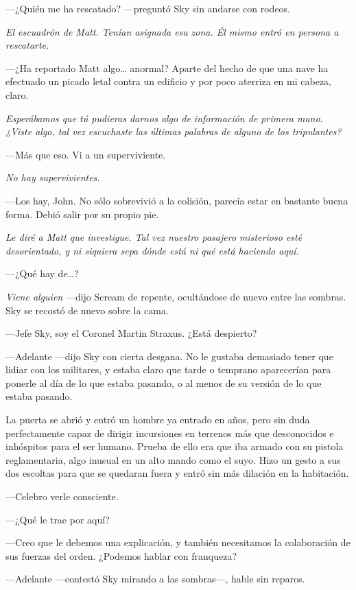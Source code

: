 ---¿Quién me ha rescatado? ---preguntó Sky sin andarse con rodeos.

\emph{El escuadrón de Matt. Tenían asignada esa zona. Él mismo entró en persona a rescatarte.}

---¿Ha reportado Matt algo\dots{} anormal? Aparte del hecho de que una nave ha efectuado un picado letal contra un edificio y por poco aterriza en mi cabeza, claro.

\emph{Esperábamos que tú pudieras darnos algo de información de primera mano. ¿Viste algo, tal vez escuchaste las últimas palabras de alguno de los tripulantes?}

---Más que eso. Vi a un superviviente.

\emph{No hay supervivientes.}

---Los hay, John. No sólo sobrevivió a la colisión, parecía estar en bastante buena forma. Debió salir por su propio pie.

\emph{Le diré a Matt que investigue. Tal vez nuestro pasajero misterioso esté desorientado, y ni siquiera sepa dónde está ni qué está haciendo aquí.}

---¿Qué hay de\dots{}?

\emph{Viene alguien} ---dijo Scream de repente, ocultándose de nuevo entre las sombras. Sky se recostó de nuevo sobre la cama.

---Jefe Sky, soy el Coronel Martin Straxus. ¿Está despierto?

---Adelante ---dijo Sky con cierta desgana. No le gustaba demasiado tener que lidiar con los militares, y estaba claro que tarde o temprano aparecerían para ponerle al día de lo que estaba pasando, o al menos de su versión de lo que estaba pasando.

La puerta se abrió y entró un hombre ya entrado en años, pero sin duda perfectamente capaz de dirigir incursiones en terrenos más que desconocidos e inhóspitos para el ser humano. Prueba de ello era que iba armado con su pistola reglamentaria, algo inusual en un alto mando como el suyo. Hizo un gesto a sus dos escoltas para que se quedaran fuera y entró sin más dilación en la habitación.

---Celebro verle consciente.

---¿Qué le trae por aquí?

---Creo que le debemos una explicación, y también necesitamos la colaboración de sus fuerzas del orden. ¿Podemos hablar con franqueza?

---Adelante ---contestó Sky mirando a las sombras---, hable sin reparos.

